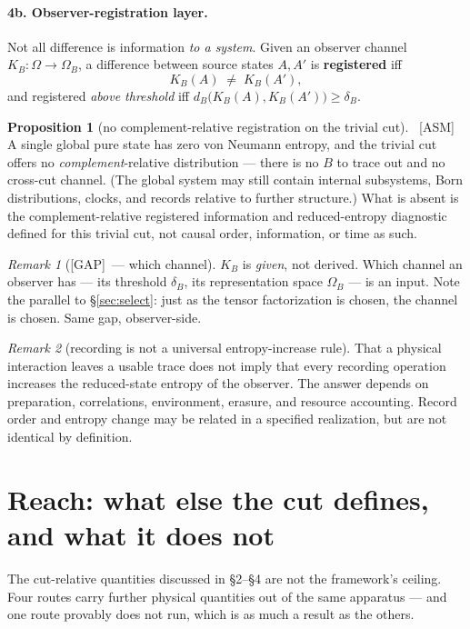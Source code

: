 \documentclass[11pt]{article}
\newcommand{\asm}{\textcolor{blue!70!black}{\textsf{\small[ASM]}}}
\newcommand{\gap}{\textcolor{red!75!black}{\textsf{\small[GAP]}}}
\theoremstyle{definition}
\newtheorem{proposition}{Proposition}[section]
\theoremstyle{remark}
\newtheorem*{remark}{Remark}
\begin{document}
\paragraph{4b. Observer-registration layer.}
Not all difference is information \emph{to a system}. Given an observer channel $K_B : \Omega \to \Omega_B$, a difference between source states $A, A'$ is \textbf{registered} iff
\[
  K_B(A) \;\neq\; K_B(A'),
\]
and registered \emph{above threshold} iff $d_B\big(K_B(A), K_B(A')\big) \ge \delta_B$.

\begin{proposition}[no complement-relative registration on the trivial cut]{\normalfont\ \asm}
A single global pure state has zero von Neumann entropy, and the trivial cut offers no \emph{complement}-relative distribution --- there is no $B$ to trace out and no cross-cut channel. (The global system may still contain internal subsystems, Born distributions, clocks, and records relative to further structure.) What is absent is the complement-relative registered information and reduced-entropy diagnostic defined for this trivial cut, not causal order, information, or time as such.
\end{proposition}

\begin{remark}[\gap\ --- which channel]
$K_B$ is \emph{given}, not derived. Which channel an observer has --- its threshold $\delta_B$, its representation space $\Omega_B$ --- is an input. Note the parallel to \S\ref{sec:select}: just as the tensor factorization is chosen, the channel is chosen. Same gap, observer-side.
\end{remark}

\begin{remark}[recording is not a universal entropy-increase rule]
That a physical interaction leaves a usable trace does not imply that every recording operation increases the reduced-state entropy of the observer. The answer depends on preparation, correlations, environment, erasure, and resource accounting. Record order and entropy change may be related in a specified realization, but are not identical by definition.
\end{remark}

\section{Reach: what else the cut defines, and what it does not}\label{sec:reach}

The cut-relative quantities discussed in \S2--\S4 are not the framework's ceiling. Four routes carry further physical quantities out of the same apparatus --- and one route provably does not run, which is as much a result as the others.
\end{document}
